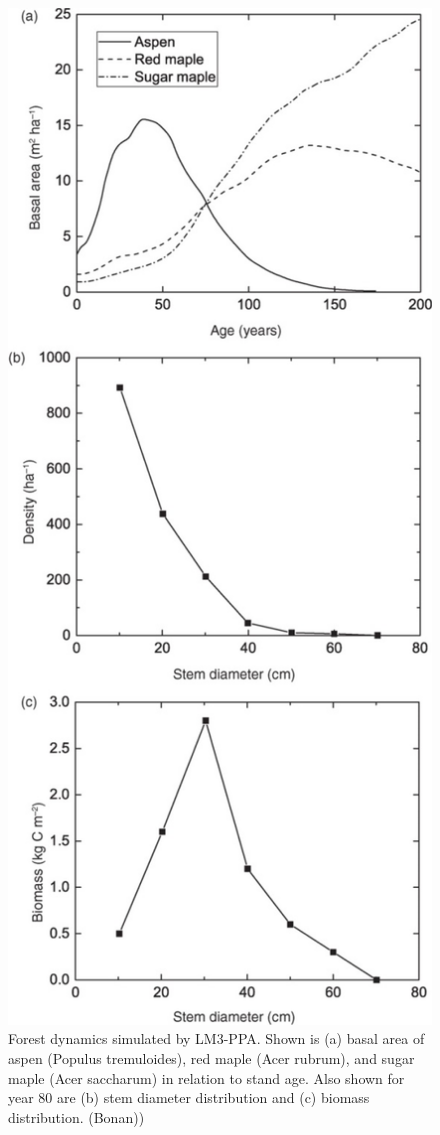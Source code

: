 \documentclass[
  12pt,
  oneside]{book}
\begin{document}
\begin{figure}

{\centering \includegraphics[width=0.8\linewidth]{figures/chap6/f633_LM3_ppa_succession} 

}

\caption{Forest dynamics simulated by LM3-PPA. Shown is (a) basal area of aspen (Populus tremuloides), red maple (Acer rubrum), and sugar maple (Acer saccharum) in relation to stand age. Also shown for year 80 are (b) stem diameter distribution and (c) biomass distribution. (Bonan))}\label{fig:f633}
\end{figure}
\end{document}
